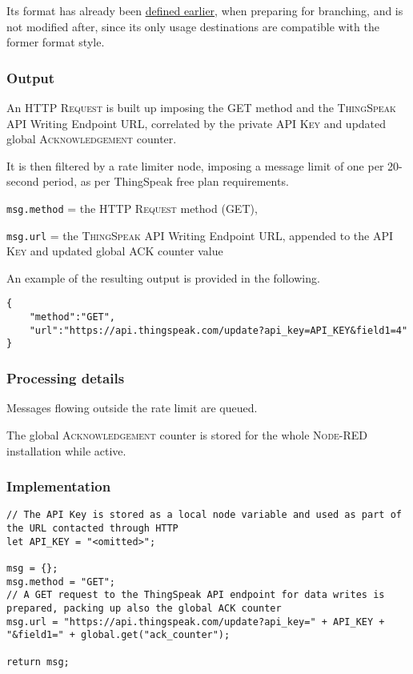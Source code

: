 \documentclass[a4paper,11pt]{article} %
\begin{document}
    \smallskip

    Its format has already been \hyperref[subsec:check-and-prepare:-function-node]{defined earlier}, when preparing for branching, and is not modified after, since its only usage destinations are compatible with the former format style.

    \subsubsection{Output}

    An \textsc{HTTP Request} is built up imposing the \textsc{GET} method and the \textsc{ThingSpeak} API Writing Endpoint \textsc{URL}, correlated by the private \textsc{API Key} and updated global \textsc{Acknowledgement} counter.

    \smallskip

    It is then filtered by a rate limiter node, imposing a message limit of one per 20-second period, as per ThingSpeak free plan requirements.

    \smallskip

    \texttt{msg.method} = the \textsc{HTTP Request} method (GET),

    \texttt{msg.url} = the \textsc{ThingSpeak} API Writing Endpoint URL, appended to the \textsc{API Key} and updated global ACK counter value

    \medskip

    An example of the resulting output is provided in the following.

    \begin{verbatim}
{
    "method":"GET",
    "url":"https://api.thingspeak.com/update?api_key=API_KEY&field1=4"
}
    \end{verbatim}

    \subsubsection{Processing details}

    Messages flowing outside the rate limit are queued.

    \smallskip

    The global \textsc{Acknowledgement} counter is stored for the whole \textsc{Node-RED} installation while active.

    \subsubsection{Implementation}

    \begin{verbatim}
// The API Key is stored as a local node variable and used as part of the URL contacted through HTTP
let API_KEY = "<omitted>";

msg = {};
msg.method = "GET";
// A GET request to the ThingSpeak API endpoint for data writes is prepared, packing up also the global ACK counter
msg.url = "https://api.thingspeak.com/update?api_key=" + API_KEY + "&field1=" + global.get("ack_counter");

return msg;
    \end{verbatim}
\end{document}
